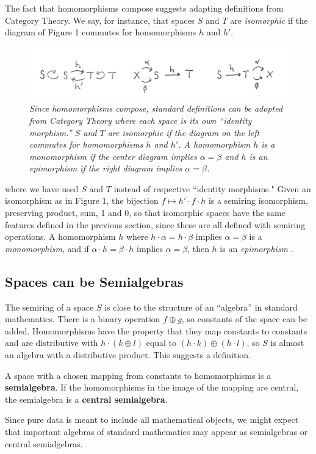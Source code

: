 \documentclass[11pt]{article}
\begin{document}
The fact that homomorphisms compose suggests adapting definitions from Category Theory.  
We say, for instance, that spaces $S$ and $T$ are {\it isomorphic} if the diagram of Figure 1 commutes for homomorphisms 
$h$ and $h'$.  
\begin{figure}[h]
\centering
\includegraphics[width=1.0\textwidth]{isomorphism.png}
\caption{{\it Since homomorphisms compose, standard definitions can be adopted from Category Theory where each space is its own ``identity morphism.'' 
$S$ and $T$ are isomorphic if the diagram on the left commutes for homomorphisms $h$ and $h'$.  A homomorphism $h$ is a monomorphism if the center 
diagram implies $\alpha=\beta$ and $h$ is an epimorphism if the right diagram implies $\alpha=\beta$.}}  
\end{figure}
where we have used $S$ and $T$ instead of respective ``identity morphisms."  Given an isomorphism as in Figure 1, the bijection $f\mapsto h'\cdot f \cdot h$ is 
a semiring isomorphism, preserving product, sum, 1 and 0, so that isomorphic spaces have the same features defined in the previous section, since 
these are all defined with semiring operations.  A homomorphism $h$ where $h\cdot \alpha=h\cdot \beta$ implies $\alpha=\beta$ is a {\it monomorphism}, and if $\alpha\cdot h=\beta\cdot h$ implies $\alpha=\beta$, then $h$ is an {\it epimorphism} \cite{categories}.  

\subsection{Spaces can be Semialgebras} 

The semiring of a space $S$ is close to the structure of an ``algebra'' in standard mathematics.  There is a binary operation $f\oplus g$, so 
constants of the space can be added.  Homomorphisms have the property that they map constants to constants and are distributive with 
$h\cdot (k\oplus l)$ equal to $(h\cdot k)\oplus (h\cdot l)$, so $S$ is almost an algebra with a distributive product.  
This suggests a definition. 

\begin{definition}
A space with a chosen mapping from constants to homomorphisms is a {\bf semialgebra}.  If the homomorphisms 
in the image of the mapping are central, the semialgebra is a {\bf central semialgebra}.  
\end{definition}
\noindent Since pure data is meant to include all mathematical objects, we might expect that important algebras of standard 
mathematics may appear as semialgebras or central semialgebras. 
\end{document}
